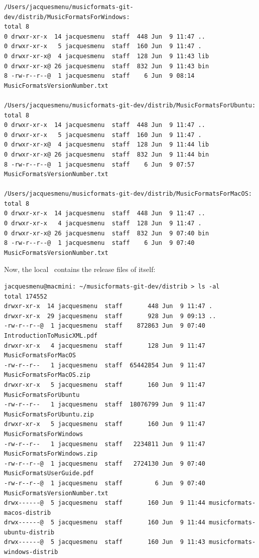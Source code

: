 \begin{enumerate}
\begin{lstlisting}[language=TerminalSmall]
/Users/jacquesmenu/musicformats-git-dev/distrib/MusicFormatsForWindows:
total 8
0 drwxr-xr-x  14 jacquesmenu  staff  448 Jun  9 11:47 ..
0 drwxr-xr-x   5 jacquesmenu  staff  160 Jun  9 11:47 .
0 drwxr-xr-x@  4 jacquesmenu  staff  128 Jun  9 11:43 lib
0 drwxr-xr-x@ 26 jacquesmenu  staff  832 Jun  9 11:43 bin
8 -rw-r--r--@  1 jacquesmenu  staff    6 Jun  9 08:14 MusicFormatsVersionNumber.txt

/Users/jacquesmenu/musicformats-git-dev/distrib/MusicFormatsForUbuntu:
total 8
0 drwxr-xr-x  14 jacquesmenu  staff  448 Jun  9 11:47 ..
0 drwxr-xr-x   5 jacquesmenu  staff  160 Jun  9 11:47 .
0 drwxr-xr-x@  4 jacquesmenu  staff  128 Jun  9 11:44 lib
0 drwxr-xr-x@ 26 jacquesmenu  staff  832 Jun  9 11:44 bin
8 -rw-r--r--@  1 jacquesmenu  staff    6 Jun  9 07:57 MusicFormatsVersionNumber.txt

/Users/jacquesmenu/musicformats-git-dev/distrib/MusicFormatsForMacOS:
total 8
0 drwxr-xr-x  14 jacquesmenu  staff  448 Jun  9 11:47 ..
0 drwxr-xr-x   4 jacquesmenu  staff  128 Jun  9 11:47 .
0 drwxr-xr-x@ 26 jacquesmenu  staff  832 Jun  9 07:40 bin
8 -rw-r--r--@  1 jacquesmenu  staff    6 Jun  9 07:40 MusicFormatsVersionNumber.txt
\end{lstlisting}

Now, the local \masterBranch\ contains the release files of itself:
\begin{lstlisting}[language=TerminalSmall]
jacquesmenu@macmini: ~/musicformats-git-dev/distrib > ls -al
total 174552
drwxr-xr-x  14 jacquesmenu  staff       448 Jun  9 11:47 .
drwxr-xr-x  29 jacquesmenu  staff       928 Jun  9 09:13 ..
-rw-r--r--@  1 jacquesmenu  staff    872863 Jun  9 07:40 IntroductionToMusicXML.pdf
drwxr-xr-x   4 jacquesmenu  staff       128 Jun  9 11:47 MusicFormatsForMacOS
-rw-r--r--   1 jacquesmenu  staff  65442854 Jun  9 11:47 MusicFormatsForMacOS.zip
drwxr-xr-x   5 jacquesmenu  staff       160 Jun  9 11:47 MusicFormatsForUbuntu
-rw-r--r--   1 jacquesmenu  staff  18076799 Jun  9 11:47 MusicFormatsForUbuntu.zip
drwxr-xr-x   5 jacquesmenu  staff       160 Jun  9 11:47 MusicFormatsForWindows
-rw-r--r--   1 jacquesmenu  staff   2234811 Jun  9 11:47 MusicFormatsForWindows.zip
-rw-r--r--@  1 jacquesmenu  staff   2724130 Jun  9 07:40 MusicFormatsUserGuide.pdf
-rw-r--r--@  1 jacquesmenu  staff         6 Jun  9 07:40 MusicFormatsVersionNumber.txt
drwx------@  5 jacquesmenu  staff       160 Jun  9 11:44 musicformats-macos-distrib
drwx------@  5 jacquesmenu  staff       160 Jun  9 11:44 musicformats-ubuntu-distrib
drwx------@  5 jacquesmenu  staff       160 Jun  9 11:43 musicformats-windows-distrib
\end{lstlisting}



\end{enumerate}
